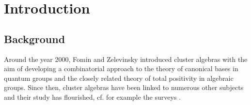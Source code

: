 \documentclass{amsart}
\theoremstyle{definition}
\theoremstyle{remark}
\numberwithin{equation}{section}
\begin{document}
\begin{abstract}
It is known that many (upper) cluster algebras are not unique factorization domains. We exhibit the local factorization properties with respect to any given seed $t$: any non-zero element in a full rank upper cluster algebra can be uniquely written as the product of a cluster monomial in $t$ and another element not divisible by the cluster variables in $t$. Our approach is based on introducing the valuation pairing on an upper cluster algebra: it counts the maximal multiplicity of a cluster variable among the factorizations of any given element. 

We apply the valuation pairing to obtain many results concerning factoriality, $d$-vectors, $F$-polynomials and the combinatorics of cluster Poisson variables. In particular, we obtain that full rank and primitive upper cluster algebras are factorial; an explanation of $d$-vectors using valuation pairing; a cluster monomial in non-initial cluster variables is determined by its $F$-polynomial; the $F$-polynomials of non-initial cluster variables are irreducible; and the cluster Poisson variables parametrize the exchange pairs of the corresponding upper cluster algebra.
\end{abstract}

\maketitle


\tableofcontents
  

\section{Introduction}

\subsection{Background}
Around the year 2000, Fomin and Zelevinsky introduced  cluster
algebras \cite{FZ} with the aim of developing a combinatorial approach
to the theory of canonical bases in quantum groups and the closely
related theory of total positivity in algebraic groups. Since then,
cluster algebras have been linked to numerous other subjects
and their study has flourished, cf. for example the surveys
\cite{Leclerc10, Fomin10b, Keller12a, Keller19a}.
\end{document}
